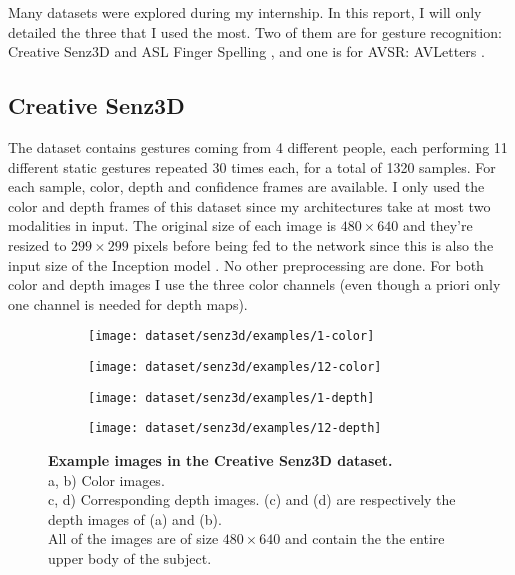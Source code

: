 Many datasets were explored during my internship. In this report,
I will only detailed the three that I used the most. Two of them are for
gesture recognition: Creative Senz3D \cite{A. Memo 2015, A. Memo 2017}
and ASL Finger Spelling \cite{N. Pugeault 2011}, and one is for AVSR:
AVLetters \cite{I. Matthews 2002}.

\subsection{Creative Senz3D}

The dataset contains gestures coming from 4 different people, each
performing 11 different static gestures repeated 30 times each,
for a total of 1320 samples.
For each sample, color, depth and confidence frames are available.
I only used the color and depth frames of this dataset since my
architectures take at most two modalities in input. The original
size of each image is $480 \times 640$ and they're resized to
$299 \times 299$ pixels before being fed to the network since this
is also the input size of the Inception model \cite{C. Szegedy 2017}.
No other preprocessing are done. For both color and depth images I use
the three color channels (even though a priori only one channel is needed
for depth maps).

\begin{figure}[H]
  \centering
  \hfill
  \begin{subfigure}{0.23\linewidth}
    \centering
    \texttt{[image: dataset/senz3d/examples/1-color]}
    \caption{}
  \end{subfigure}
  \hfill
  \begin{subfigure}{0.23\linewidth}
    \centering
    \texttt{[image: dataset/senz3d/examples/12-color]}
    \caption{}
  \end{subfigure}
  \hfill
  \begin{subfigure}{0.23\linewidth}
    \centering
    \texttt{[image: dataset/senz3d/examples/1-depth]}
    \caption{}
  \end{subfigure}
  \hfill
  \begin{subfigure}{0.23\linewidth}
    \centering
    \texttt{[image: dataset/senz3d/examples/12-depth]}
    \caption{}
  \end{subfigure}
  \caption{%
    \textbf{Example images in the Creative Senz3D dataset.}\\[0.1em]
    a, b) Color images.\\[0.1em]
    c, d) Corresponding depth images. (c) and (d) are respectively the
      depth images of (a) and (b).\\[0.1em]
    All of the images are of size $480 \times 640$ and contain the
      the entire upper body of the subject.}
  \label{fig:senz3d_exs}
\end{figure}

